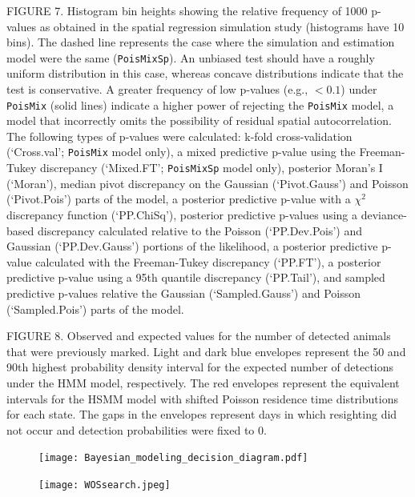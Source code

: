 \documentclass[12pt,english]{article}
\begin{document}
\begin{spacing}{1.9}
FIGURE 7.  Histogram bin heights showing the relative frequency of
1000 p-values as obtained in the spatial regression simulation study
(histograms have 10 bins).  The dashed line represents the case where
the simulation and estimation model were the same
(\texttt{PoisMixSp}).  An unbiased test should have a roughly uniform
distribution in this case, whereas concave distributions indicate that
the test is conservative.  A greater frequency of low p-values (e.g.,
$<0.1$) under \texttt{PoisMix} (solid lines) indicate a higher power
of rejecting the \texttt{PoisMix} model, a model that incorrectly
omits the possibility of residual spatial autocorrelation.  The
following types of p-values were calculated: k-fold cross-validation
(`Cross.val'; \texttt{PoisMix} model only), a mixed predictive p-value
using the Freeman-Tukey discrepancy (`Mixed.FT'; \texttt{PoisMixSp}
model only), posterior Moran's I (`Moran'), median pivot discrepancy
on the Gaussian (`Pivot.Gauss') and Poisson (`Pivot.Pois') parts of
the model, a posterior predictive p-value with a $\chi^2$ discrepancy
function (`PP.ChiSq'), posterior predictive p-values using a
deviance-based discrepancy calculated relative to the Poisson
(`PP.Dev.Pois') and Gaussian (`PP.Dev.Gauss') portions of the
likelihood, a posterior predictive p-value calculated with the
Freeman-Tukey discrepancy (`PP.FT'), a posterior predictive p-value
using a 95th quantile discrepancy (`PP.Tail'), and sampled predictive
p-values relative the Gaussian (`Sampled.Gauss') and Poisson
(`Sampled.Pois') parts of the model.

FIGURE 8. Observed and expected values for the number of detected
animals that were previously marked. Light and dark blue envelopes
represent the 50 and 90th highest probability density interval for the
expected number of detections under the HMM model, respectively. The
red envelopes represent the equivalent intervals for the HSMM model
with shifted Poisson residence time distributions for each state. The
gaps in the envelopes represent days in which resighting did not occur
and detection probabilities were fixed to 0.


\pagebreak

\begin{figure}
  \begin{center}
    \texttt{[image: Bayesian\_modeling\_decision\_diagram.pdf]}
    \caption{} \label{fig:decision}
  \end{center}
\end{figure}

\begin{figure}
  \begin{center}
    \texttt{[image: WOSsearch.jpeg]}
    \caption{} \label{fig:WOS}
  \end{center}
\end{figure}


\end{spacing}
\end{document}
